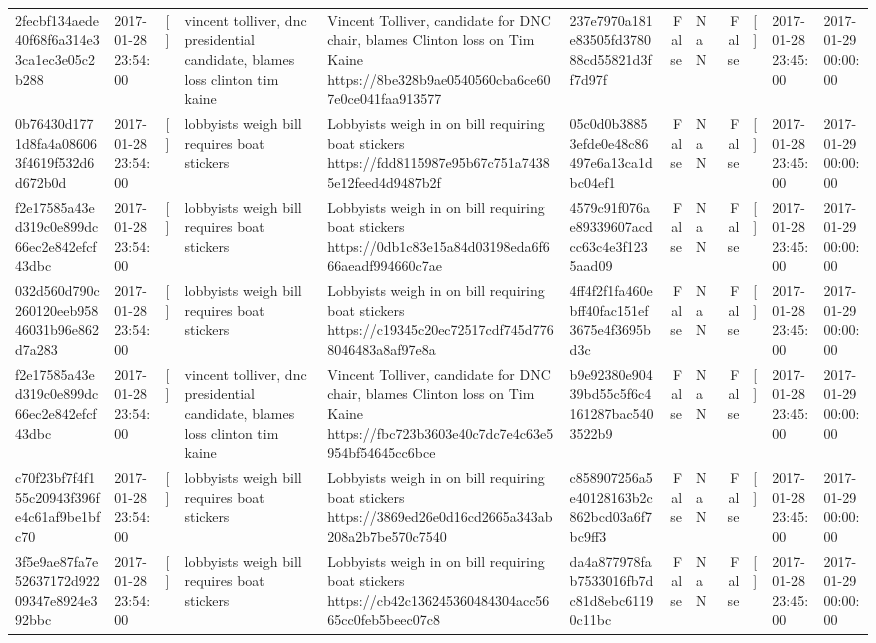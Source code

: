 \begin{tabular}{llllllrlrlll}
2fecbf134aede40f68f6a314e33ca1ec3e05c2b288 & 2017-01-28 23:54:00 & [] & vincent tolliver, dnc presidential candidate, blames loss clinton tim kaine & Vincent Tolliver, candidate for DNC chair, blames Clinton loss on Tim Kaine https://8be328b9ae0540560cba6ce607e0ce041faa913577 & 237e7970a181e83505fd378088cd55821d3ff7d97f & False & NaN & False & [] & 2017-01-28 23:45:00 & 2017-01-29 00:00:00 \\
0b76430d1771d8fa4a086063f4619f532d6d672b0d & 2017-01-28 23:54:00 & [] & lobbyists weigh bill requires boat stickers & Lobbyists weigh in on bill requiring boat stickers https://fdd8115987e95b67c751a74385e12feed4d9487b2f & 05c0d0b38853efde0e48c86497e6a13ca1dbc04ef1 & False & NaN & False & [] & 2017-01-28 23:45:00 & 2017-01-29 00:00:00 \\
f2e17585a43ed319c0e899dc66ec2e842efcf43dbc & 2017-01-28 23:54:00 & [] & lobbyists weigh bill requires boat stickers & Lobbyists weigh in on bill requiring boat stickers https://0db1c83e15a84d03198eda6f666aeadf994660c7ae & 4579c91f076ae89339607acdcc63c4e3f1235aad09 & False & NaN & False & [] & 2017-01-28 23:45:00 & 2017-01-29 00:00:00 \\
032d560d790c260120eeb95846031b96e862d7a283 & 2017-01-28 23:54:00 & [] & lobbyists weigh bill requires boat stickers & Lobbyists weigh in on bill requiring boat stickers https://c19345c20ec72517cdf745d7768046483a8af97e8a & 4ff4f2f1fa460ebff40fac151ef3675e4f3695bd3c & False & NaN & False & [] & 2017-01-28 23:45:00 & 2017-01-29 00:00:00 \\
f2e17585a43ed319c0e899dc66ec2e842efcf43dbc & 2017-01-28 23:54:00 & [] & vincent tolliver, dnc presidential candidate, blames loss clinton tim kaine & Vincent Tolliver, candidate for DNC chair, blames Clinton loss on Tim Kaine https://fbc723b3603e40c7dc7e4c63e5954bf54645cc6bce & b9e92380e90439bd55c5f6c4161287bac5403522b9 & False & NaN & False & [] & 2017-01-28 23:45:00 & 2017-01-29 00:00:00 \\
c70f23bf7f4f155c20943f396fe4c61af9be1bfc70 & 2017-01-28 23:54:00 & [] & lobbyists weigh bill requires boat stickers & Lobbyists weigh in on bill requiring boat stickers https://3869ed26e0d16cd2665a343ab208a2b7be570c7540 & c858907256a5e40128163b2c862bcd03a6f7bc9ff3 & False & NaN & False & [] & 2017-01-28 23:45:00 & 2017-01-29 00:00:00 \\
3f5e9ae87fa7e52637172d92209347e8924e392bbc & 2017-01-28 23:54:00 & [] & lobbyists weigh bill requires boat stickers & Lobbyists weigh in on bill requiring boat stickers https://cb42c136245360484304acc5665cc0feb5beec07c8 & da4a877978fab7533016fb7dc81d8ebc61190c11bc & False & NaN & False & [] & 2017-01-28 23:45:00 & 2017-01-29 00:00:00 \\

\end{tabular}
